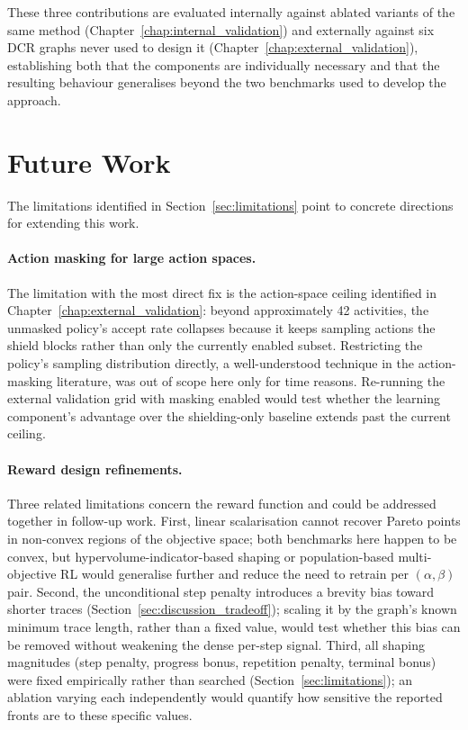 These three contributions are evaluated internally against ablated variants of the same method (Chapter~\ref{chap:internal_validation}) and externally against six \ac{DCR} graphs never used to design it (Chapter~\ref{chap:external_validation}), establishing both that the components are individually necessary and that the resulting behaviour generalises beyond the two benchmarks used to develop the approach.

\section{Future Work}
\label{sec:future_work}

The limitations identified in Section~\ref{sec:limitations} point to concrete directions for extending this work.

\paragraph{Action masking for large action spaces.} The limitation with the most direct fix is the action-space ceiling identified in Chapter~\ref{chap:external_validation}: beyond approximately 42 activities, the unmasked policy's accept rate collapses because it keeps sampling actions the shield blocks rather than only the currently enabled subset. Restricting the policy's sampling distribution directly, a well-understood technique in the action-masking literature, was out of scope here only for time reasons. Re-running the external validation grid with masking enabled would test whether the learning component's advantage over the shielding-only baseline extends past the current ceiling.

\paragraph{Reward design refinements.} Three related limitations concern the reward function and could be addressed together in follow-up work. First, linear scalarisation cannot recover Pareto points in non-convex regions of the objective space; both benchmarks here happen to be convex, but hypervolume-indicator-based shaping or population-based multi-objective RL would generalise further and reduce the need to retrain per $(\alpha,\beta)$ pair. Second, the unconditional step penalty introduces a brevity bias toward shorter traces (Section~\ref{sec:discussion_tradeoff}); scaling it by the graph's known minimum trace length, rather than a fixed value, would test whether this bias can be removed without weakening the dense per-step signal. Third, all shaping magnitudes (step penalty, progress bonus, repetition penalty, terminal bonus) were fixed empirically rather than searched (Section~\ref{sec:limitations}); an ablation varying each independently would quantify how sensitive the reported fronts are to these specific values.

